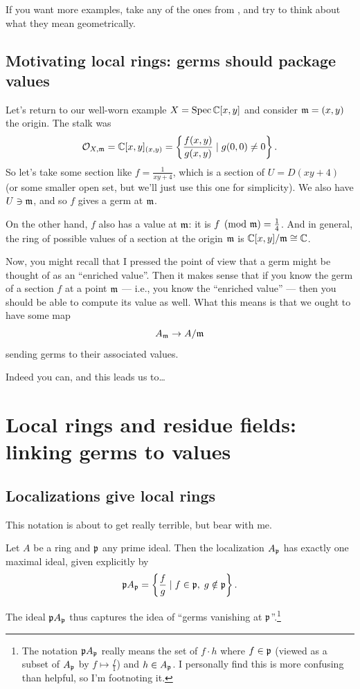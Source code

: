 If you want more examples,
take any of the ones from ,
and try to think about what they mean geometrically.

\subsection{Motivating local rings: germs should package values}
Let's return to our well-worn example $X = \operatorname{Spec} \mathbb C[x,y]$
and consider $\mathfrak m = (x,y)$ the origin.
The stalk was
\[ \mathcal O_{X, \mathfrak m} = \mathbb C[x,y]_{(x,y)}
	= \left\{ \frac{f(x,y)}{g(x,y)} \mid g(0,0) \neq 0 \right\}. \]
So let's take some section like $f = \frac{1}{xy + 4}$,
which is a section of $U = D(xy+4)$ (or some smaller open set,
but we'll just use this one for simplicity).
We also have $U \ni \mathfrak m$, and so $f$ gives a germ at $\mathfrak m$.

On the other hand, $f$ also has a value at $\mathfrak m$:
it is $f \pmod{\mathfrak m} = \frac 14$.
And in general, the ring of possible values of a section
at the origin $\mathfrak m$ is $\mathbb C[x,y] / \mathfrak m \cong \mathbb C$.

Now, you might recall that I pressed the point of view
that a germ might be thought of as an ``enriched value''.
Then it makes sense that if you know the germ of a section $f$ at
a point $\mathfrak m$ --- i.e., you know the ``enriched value'' ---
then you should be able to compute its value as well.
What this means is that we ought to have some map
\[ A_\mathfrak m \to A/\mathfrak m \]
sending germs to their associated values.

Indeed you can, and this leads us to\dots

\section{Local rings and residue fields:
linking germs to values}

\subsection{Localizations give local rings}
This notation is about to get really terrible, but bear with me.
\begin{theorem}
	\label{thm:stalks_local_ring}
	Let $A$ be a ring and $\mathfrak p$ any prime ideal.
	Then the localization $A_\mathfrak p$ has exactly one maximal ideal,
	given explicitly by
	\[ \mathfrak p A_\mathfrak p =
		\left\{ \frac fg \mid f \in \mathfrak p, \; g \notin \mathfrak p \right\}. \]
\end{theorem}
The ideal $\mathfrak p A_\mathfrak p$ thus captures the idea
of ``germs vanishing at $\mathfrak p$''.\footnote{The notation $\mathfrak p A_\mathfrak p$ really means
the set of $f \cdot h$ where $f \in \mathfrak p$
(viewed as a subset of $A_\mathfrak p$ by $f \mapsto \frac f1$) and $h \in A_{\mathfrak p}$.
I personally find this is more confusing than helpful,
so I'm footnoting it.}

